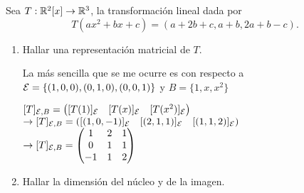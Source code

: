 \item Sea $T:\mathbb{R}^2[x]\to\mathbb{R}^3$, la transformación lineal dada por \[T(ax^2+bx+c)=(a+2b+c,a+b,2a+b-c).\]
    \begin{enumerate}
        \item Hallar una representación matricial de $T$.
            \begin{mdframed}[style=s]
                La más sencilla que se me ocurre es con respecto a $\mathcal{E}=\{(1,0,0),(0,1,0),(0,0,1)\}$ y $B=\{1,x,x^2\}$
                \begin{center}
                    $[T]_{\mathcal{E},B}=\left([T(1)]_{\mathcal{E}}\quad[T(x)]_{\mathcal{E}}\quad[T(x^2)]_{\mathcal{E}}\right)$\\
                    $\to [T]_{\mathcal{E},B}=\left([(1,0,-1)]_{\mathcal{E}}\quad[(2,1,1)]_{\mathcal{E}}\quad[(1,1,2)]_{\mathcal{E}}\right)$\\
                    $\to [T]_{\mathcal{E},B}=\begin{pmatrix}
                        1&2&1\\0&1&1\\-1&1&2
                    \end{pmatrix}$ 
                \end{center}
            \end{mdframed}
        \item Hallar la dimensión del núcleo y de la imagen.
\end{enumerate}
